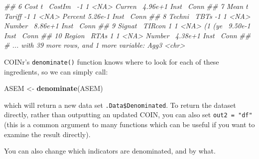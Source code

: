 \documentclass[
]{book}
\newenvironment{Shaded}{\begin{snugshade}}{\end{snugshade}}
\newcommand{\CommentTok}[1]{\textcolor[rgb]{0.56,0.35,0.01}{\textit{#1}}}
\newcommand{\DataTypeTok}[1]{\textcolor[rgb]{0.13,0.29,0.53}{#1}}
\newcommand{\KeywordTok}[1]{\textcolor[rgb]{0.13,0.29,0.53}{\textbf{#1}}}
\newcommand{\NormalTok}[1]{#1}
\newcommand{\OperatorTok}[1]{\textcolor[rgb]{0.81,0.36,0.00}{\textbf{#1}}}
\newcommand{\StringTok}[1]{\textcolor[rgb]{0.31,0.60,0.02}{#1}}
\begin{document}
\begin{Shaded}
\begin{Highlighting}[]
\CommentTok{##  6 Cost t~ CostIm~        -1         1 <NA>        Curren~ 4.96e+1 Inst~ Conn }
\CommentTok{##  7 Mean t~ Tariff         -1         1 <NA>        Percent 5.26e-1 Inst~ Conn }
\CommentTok{##  8 Techni~ TBTs           -1         1 <NA>        Number~ 8.86e+1 Inst~ Conn }
\CommentTok{##  9 Signat~ TIRcon          1         1 <NA>        (1 (ye~ 9.50e-1 Inst~ Conn }
\CommentTok{## 10 Region~ RTAs            1         1 <NA>        Number~ 4.38e+1 Inst~ Conn }
\CommentTok{## # ... with 39 more rows, and 1 more variable: Agg3 <chr>}
\end{Highlighting}
\end{Shaded}

COINr's \texttt{denominate()} function knows where to look for each of these ingredients, so we can simply call:

\begin{Shaded}
\begin{Highlighting}[]
\NormalTok{ASEM <-}\StringTok{ }\KeywordTok{denominate}\NormalTok{(ASEM)}
\end{Highlighting}
\end{Shaded}

which will return a new data set \texttt{.Data\$Denominated}. To return the dataset directly, rather than outputting an updated COIN, you can also set \texttt{out2\ =\ "df"} (this is a common argument to many functions which can be useful if you want to examine the result directly).

You can also change which indicators are denominated, and by what.

\begin{Shaded}
\end{Shaded}
\end{document}
